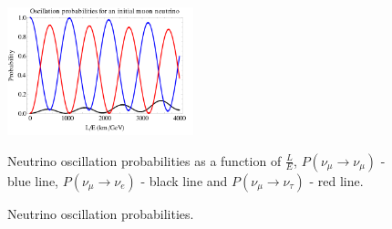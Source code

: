 \begin{figure}
\vspace{-20pt}
  \begin{center}
    \includegraphics[width=0.48\textwidth]{figures/Neutrino_osc.png}
  \end{center}
\vspace{-30pt}
\caption{Neutrino oscillation probabilities.}
{Neutrino oscillation probabilities as a function of $\frac{L}{E}$, $P(\nu_\mu \rightarrow \nu_\mu)$ - 
blue line, $P(\nu_\mu \rightarrow \nu_e)$ - black line and $P(\nu_\mu \rightarrow \nu_\tau)$ - red line.}
\end{figure}

